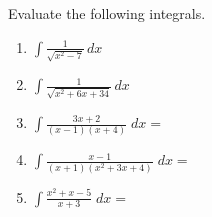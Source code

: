 \documentclass{exam}[12pt]
\begin{document}
\pagestyle{head}

\extraheadheight{.3in}
\extrafootheight{-.3in} 


\vspace{.2in}
\large{
Evaluate the following integrals.
\begin{enumerate}
\item $\displaystyle \int \frac{1}{\sqrt{x^2 - 7}}   \, dx$
\vspace{2.3in}

\item $\displaystyle \int \frac{1}{\sqrt{x^2 +6x + 34}}   \, dx$
\vspace{2.3in}


\item $\displaystyle \int  \frac{3x+2}{(x-1)(x+4)}  \; dx = $
\vspace{3.5in}

\item $\displaystyle \int \frac{x-1}{(x+1)(x^2+3x+4)}\; dx =$
\vspace{4.8in}

\item $\displaystyle \int  \frac{x^2 + x -5}{x + 3}     \; dx = $
\vspace{3.2in}


\end{enumerate}
}
\end{document}
